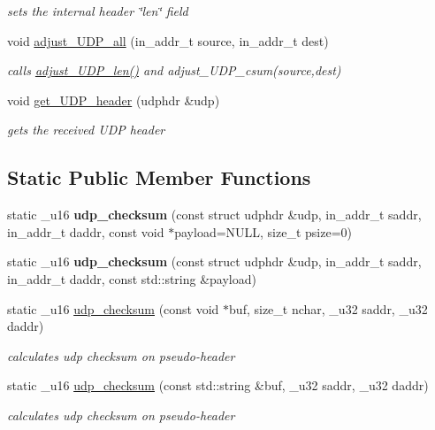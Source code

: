 \begin{CompactItemize}
\begin{CompactList}\small\item\em sets the internal header \char`\"{}len\char`\"{} field \item\end{CompactList}\item 
void \hyperlink{classsocketpp_1_1UDP__RawSocket_4fe2e6b184ca8f8248a187df30e12fd2}{adjust\_\-UDP\_\-all} (in\_\-addr\_\-t source, in\_\-addr\_\-t dest)
\begin{CompactList}\small\item\em calls \hyperlink{classsocketpp_1_1UDP__RawSocket_1caa413cfe4f72d8c0aeccdcb10469b5}{adjust\_\-UDP\_\-len()} and adjust\_\-UDP\_\-csum(source,dest) \item\end{CompactList}\item 
void \hyperlink{classsocketpp_1_1UDP__RawSocket_597a30fc537dce06c85663add29defdc}{get\_\-UDP\_\-header} (udphdr \&udp)
\begin{CompactList}\small\item\em gets the received UDP header \item\end{CompactList}\end{CompactItemize}
\subsection*{Static Public Member Functions}
\begin{CompactItemize}
\item 
\hypertarget{classsocketpp_1_1UDP__RawSocket_095971358f1de99857aaf649aae9b1ea}{
static \_\-u16 \textbf{udp\_\-checksum} (const struct udphdr \&udp, in\_\-addr\_\-t saddr, in\_\-addr\_\-t daddr, const void $\ast$payload=NULL, size\_\-t psize=0)}
\label{classsocketpp_1_1UDP__RawSocket_095971358f1de99857aaf649aae9b1ea}

\item 
\hypertarget{classsocketpp_1_1UDP__RawSocket_331a9aa1b1bc9aa16a25954061c04551}{
static \_\-u16 \textbf{udp\_\-checksum} (const struct udphdr \&udp, in\_\-addr\_\-t saddr, in\_\-addr\_\-t daddr, const std::string \&payload)}
\label{classsocketpp_1_1UDP__RawSocket_331a9aa1b1bc9aa16a25954061c04551}

\item 
static \_\-u16 \hyperlink{classsocketpp_1_1UDP__RawSocket_8e32b5a6458da2a8660b6353a1c7ad9b}{udp\_\-checksum} (const void $\ast$buf, size\_\-t nchar, \_\-u32 saddr, \_\-u32 daddr)
\begin{CompactList}\small\item\em calculates udp checksum on pseudo-header \item\end{CompactList}\item 
static \_\-u16 \hyperlink{classsocketpp_1_1UDP__RawSocket_912bdb1e33f25bb30f7c49f9906344c5}{udp\_\-checksum} (const std::string \&buf, \_\-u32 saddr, \_\-u32 daddr)
\begin{CompactList}\small\item\em calculates udp checksum on pseudo-header \item\end{CompactList}\end{CompactItemize}
